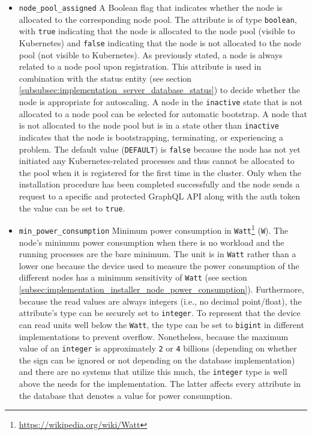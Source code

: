 \begin{itemize}
  \item \texttt{node\_pool\_assigned}
    \newline
    A Boolean flag that indicates whether the node is allocated to the
    corresponding node pool.
    \newline
    The attribute is of type \texttt{boolean}, with \texttt{true} indicating
    that the node is allocated to the node pool (visible to Kubernetes) and
    \texttt{false} indicating that the node is not allocated to the node pool (not
    visible to Kubernetes).
    \newline
    As previously stated, a node is always related to a node pool upon registration.
    This attribute is used in combination with the status entity (see section \ref{subsubsec:implementation_server_database_status})
    to decide whether the node is appropriate for autoscaling. A node in the \texttt{inactive}
    state that is not allocated to a node pool can be selected for automatic
    bootstrap. A node that is not allocated to the node pool but is in a state other
    than \texttt{inactive} indicates that the node is bootstrapping, terminating,
    or experiencing a problem.
    \newline
    The default value (\texttt{DEFAULT}) is \texttt{false} because the node has not
    yet initiated any Kubernetes-related processes and thus cannot be allocated to
    the pool when it is registered for the first time in the cluster. Only when
    the installation procedure has been completed successfully and the node
    sends a request to a specific and protected GraphQL API along with the auth
    token the value can be set to \texttt{true}.

  \item \texttt{min\_power\_consumption}
    \newline
    Minimum power consumption in \texttt{Watt}\footnote{\url{https://wikipedia.org/wiki/Watt}}
    (\texttt{W}).
    \newline
    The node's minimum power consumption when there is no workload and the running
    processes are the bare minimum.
    \newline
    The unit is in \texttt{Watt} rather than a lower one because the device used
    to measure the power consumption of the different nodes has a minimum sensitivity
    of \texttt{Watt} (see section \ref{subsec:implementation_installer_node_power_consumption}).
    Furthermore, because the read values are always integers (i.e., no decimal point/float),
    the attribute's type can be securely set to \texttt{integer}. To represent that
    the device can read units well below the \texttt{Watt}, the type can be set to
    \texttt{bigint} in different implementations to prevent overflow. Nonetheless,
    because the maximum value of an \texttt{integer} is approximately \texttt{2}
    or \texttt{4} billions (depending on whether the sign can be ignored or not
    depending on the database implementation) and there are no systems that utilize
    this much, the \texttt{integer} type is well above the needs for the implementation.
    \newline
    The latter affects every attribute in the database that denotes a value for
    power consumption.


\end{itemize}
